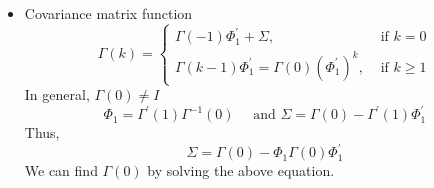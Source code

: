 \documentclass{article}
\begin{document}
\begin{itemize}
	\item Covariance matrix function
	\begin{equation*}
	\Gamma(k)=\left\{\begin{array}{ll}{\Gamma(-1) \Phi_{1}^{\prime}+\Sigma,} & {\text { if } k=0} \\ {\Gamma(k-1) \Phi_{1}^{\prime}=\Gamma(0)\left(\Phi_{1}^{\prime}\right)^{k},} & {\text { if } k \geq 1}\end{array}\right.
	\end{equation*}
	In general, $\Gamma(0) \neq I$
	\begin{equation*}
	\Phi_{1}=\Gamma^{\prime}(1) \Gamma^{-1}(0) \quad \text { and } \Sigma=\Gamma(0)-\Gamma^{\prime}(1) \Phi_{1}^{\prime}
	\end{equation*}
	Thus,
	\begin{equation*}
	\Sigma=\Gamma(0)-\Phi_{1} \Gamma(0) \Phi_{1}^{\prime}
	\end{equation*}
	We can find $\Gamma(0)$ by solving the above equation.
\end{itemize}
\end{document}
